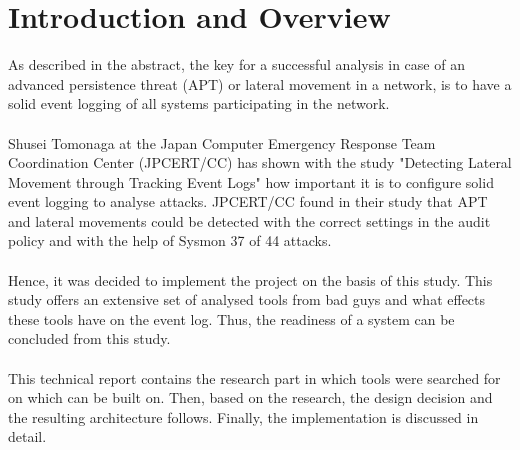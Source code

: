 \section{Introduction and Overview}
As described in the abstract, the key for a successful analysis in case of an advanced persistence threat (APT) or lateral movement in a network, is to have a solid event logging of all systems participating in the network.
\\\\
Shusei Tomonaga at the Japan Computer Emergency Response Team Coordination Center (JPCERT/CC) has shown with the study "Detecting Lateral Movement through Tracking Event Logs" \cite{JPCERTDetectingLateralMovement} how important it is to configure solid event logging to analyse attacks. JPCERT/CC found in their study that APT and lateral movements could be detected with the correct settings in the audit policy and with the help of Sysmon 37 of 44 attacks.
\\\\
Hence, it was decided to implement the project on the basis of this study. This study offers an extensive set of analysed tools from bad guys and what effects these tools have on the event log. Thus, the readiness of a system can be concluded from this study. 
\\\\
This technical report contains the research part in which tools were searched for on which can be built on. Then, based on the research, the design decision and the resulting architecture follows. Finally, the implementation is discussed in detail.